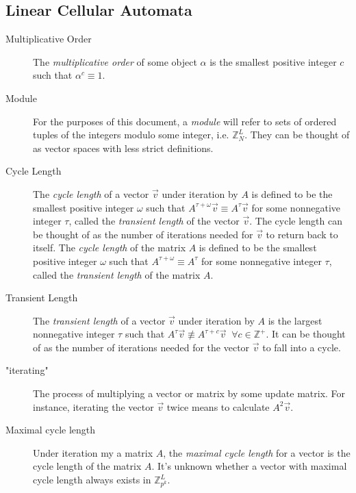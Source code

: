 \documentclass[a4paper, reqno, 12pt]{amsart}
\begin{document}
		\subsection{Linear Cellular Automata}
			\begin{description}
				\item[Multiplicative Order] The \emph{multiplicative order} of some object $\alpha$ is the smallest positive integer $c$ such that $\alpha^c \equiv 1$.
			
				\item[Module] For the purposes of this document, a \emph{module} will refer to sets of ordered tuples of the integers modulo some integer, i.e. 
				$\mathds{Z}_{N}^{L}$. They can be thought of as vector spaces with less strict definitions.
			
				\item[Cycle Length] The \emph{cycle length} of a vector $\vec{v}$ under iteration by $A$ is defined to be the smallest positive integer $\omega$ such that
				$A^{\tau + \omega}\vec{v} \equiv A^{\tau}\vec{v}$ for some nonnegative integer $\tau$, called the \emph{transient length} of the vector $\vec{v}$. The cycle 
				length can be thought of as the number of iterations needed for $\vec{v}$ to return back to itself. The \emph{cycle length} of the matrix $A$ is defined to 
				be the smallest positive integer $\omega$ such that $A^{\tau + \omega} \equiv A^{\tau}$ for some nonnegative integer $\tau$, called the \emph{transient 	
				length} of the matrix $A$.
			
				\item[Transient Length] The \emph{transient length} of a vector $\vec{v}$ under iteration by $A$ is the largest nonnegative integer $\tau$ such that 
				$A^{\tau}\vec{v} \not\equiv A^{\tau + c}\vec{v} \;\; \forall c \in \mathds{Z}^+$. It can be thought of as the number of iterations needed for the vector $
				\vec{v}$ to fall into a cycle.
			
				\item["iterating"] The process of multiplying a vector or matrix by some update matrix. For instance, iterating the vector $\vec{v}$ twice means to calculate
				$A^{2}\vec{v}$.
			
				\item[Maximal cycle length] Under iteration my a matrix $A$, the \emph{maximal cycle length} for a vector is the cycle length of the matrix $A$. It's unknown
				whether a vector with maximal cycle length always exists in $\mathds{Z}_{p^k}^{L}$.
			

\end{description}
\end{document}
